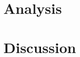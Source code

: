 \documentclass[Thesis_main]{subfiles}
\begin{document}
	\section{Analysis}
	
	\section{Discussion}
\end{document}

